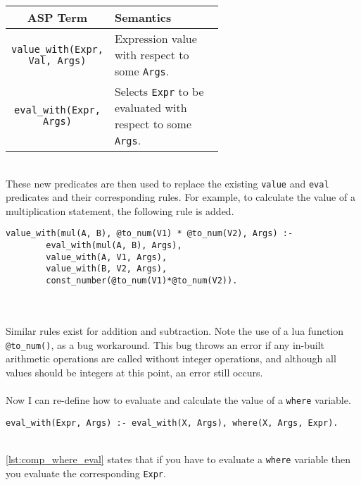 \begin{center}
\begin{tabular}{| c | m{0.6\linewidth} |}
\hline
\textbf{ASP Term} & \textbf{Semantics} \\
\hline
\lstinline!value_with(Expr, Val, Args)! 
&
\mbox{}\newline
Expression value with respect to some \lstinline!Args!. \newline
\\
\hline
\lstinline!eval_with(Expr, Args)! 
&
\mbox{}\newline
Selects \lstinline!Expr! to be evaluated with respect to some \lstinline!Args!. \newline
\\
\hline
\end{tabular}
\end{center}
\mbox{}\\
These new predicates are then used to replace the existing \lstinline!value! and \lstinline!eval! predicates and their corresponding rules. For example, to calculate the value of a multiplication statement, the following rule is added.

\begin{lstlisting}[caption={Second attempt at multiplication}, label={lst:comp_mult}, firstnumber=61]
value_with(mul(A, B), @to_num(V1) * @to_num(V2), Args) :- 
		eval_with(mul(A, B), Args), 
		value_with(A, V1, Args), 
		value_with(B, V2, Args), 
		const_number(@to_num(V1)*@to_num(V2)).
\end{lstlisting}
\mbox{} \\
\mbox{} \\
Similar rules exist for addition and subtraction. Note the use of a lua function \lstinline!@to_num()!, as a bug workaround. This bug throws an error if any in-built arithmetic operations are called without integer operations, and although all values should be integers at this point, an error still occurs. \\ \\
Now I can re-define how to evaluate and calculate the value of a \lstinline!where! variable. \\

\begin{lstlisting}[caption={Handling where evaluation}, label={lst:comp_where_eval}, firstnumber=133]
eval_with(Expr, Args) :- eval_with(X, Args), where(X, Args, Expr).
\end{lstlisting}
\mbox{} \\
\ref{lst:comp_where_eval} states that if you have to evaluate a \lstinline!where! variable then you evaluate the corresponding \lstinline!Expr!. \\
 

